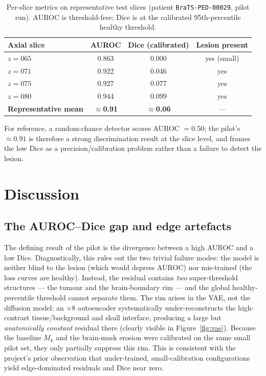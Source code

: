 \documentclass[12pt, a4paper]{article}
\begin{document}
\begin{table}[h!]
    \centering
    \caption{Per-slice metrics on representative test slices (patient \texttt{BraTS-PED-00029}, pilot run). AUROC is threshold-free; Dice is at the calibrated 95th-percentile healthy threshold.}
    \label{tab:results}
    \begin{tabular}{@{}lccc@{}}
        \toprule
        \textbf{Axial slice} & \textbf{AUROC} & \textbf{Dice (calibrated)} & \textbf{Lesion present} \\
        \midrule
        $z=065$ & 0.863 & 0.000 & yes (small) \\
        $z=071$ & 0.922 & 0.046 & yes \\
        $z=075$ & 0.927 & 0.077 & yes \\
        $z=080$ & 0.944 & 0.099 & yes \\
        \midrule
        \textbf{Representative mean} & \textbf{$\approx$0.91} & \textbf{$\approx$0.06} & --- \\
        \bottomrule
    \end{tabular}
\end{table}

\noindent For reference, a random-chance detector scores AUROC $=0.50$; the pilot's $\approx 0.91$ is therefore a strong discrimination result at the slice level, and frames the low Dice as a precision/calibration problem rather than a failure to detect the lesion.

\section{Discussion}
\subsection{The AUROC--Dice gap and edge artefacts}
The defining result of the pilot is the divergence between a high AUROC and a low Dice. Diagnostically, this rules out the two trivial failure modes: the model is neither blind to the lesion (which would depress AUROC) nor mis-trained (the loss curves are healthy). Instead, the residual contains \emph{two} super-threshold structures — the tumour and the brain-boundary rim — and the global healthy-percentile threshold cannot separate them. The rim arises in the VAE, not the diffusion model: an $\times 8$ autoencoder systematically under-reconstructs the high-contrast tissue/background and skull interface, producing a large but \emph{anatomically constant} residual there (clearly visible in Figure~\ref{fig:vae}). Because the baseline $M_k$ and the brain-mask erosion were calibrated on the same small pilot set, they only partially suppress this rim. This is consistent with the project's prior observation that under-trained, small-calibration configurations yield edge-dominated residuals and Dice near zero.
\end{document}
